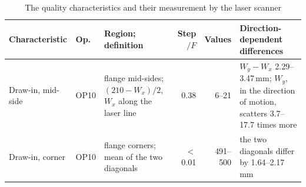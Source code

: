 \documentclass[pdflatex,sn-basic,lineno]{sn-jnl}
\newcommand{\tabsize}{\fontsize{8}{9.5}\selectfont}
\providecommand{\DIFaddbeginFL}{} %
\providecommand{\DIFdelbeginFL}{} %
\providecommand{\DIFdelendFL}{} %
\newcommand{\DIFscaledelfig}{0.5}
\newlength{\DIFdelgraphicswidth} %
\newlength{\DIFdelgraphicsheight} %
\newcommand{\DIFaddincludegraphics}[2][]{{\color{blue}\fbox{\DIFOincludegraphics[#1]{#2}}}} %
\newcommand{\DIFdelincludegraphics}[2][]{%
\sbox{\DIFdelgraphicsbox}{\DIFOincludegraphics[#1]{#2}}%
\settoboxwidth{\DIFdelgraphicswidth}{\DIFdelgraphicsbox} %
\settoboxtotalheight{\DIFdelgraphicsheight}{\DIFdelgraphicsbox} %
\scalebox{\DIFscaledelfig}{%
\parbox[b]{\DIFdelgraphicswidth}{\usebox{\DIFdelgraphicsbox}\\[-\baselineskip] \rule{\DIFdelgraphicswidth}{0em}}\llap{\resizebox{\DIFdelgraphicswidth}{\DIFdelgraphicsheight}{%
\setlength{\unitlength}{\DIFdelgraphicswidth}%
\begin{picture}(1,1)%
\thicklines\linethickness{2pt} %
{\color[rgb]{1,0,0}\put(0,0){\framebox(1,1){}}}%
{\color[rgb]{1,0,0}\put(0,0){\line( 1,1){1}}}%
{\color[rgb]{1,0,0}\put(0,1){\line(1,-1){1}}}%
\end{picture}%
}\hspace*{3pt}}} %
} %
\DeclareRobustCommand{\DIFaddbeginFL}{\DIFOaddbeginFL \let\includegraphics\DIFaddincludegraphics} %
\DeclareRobustCommand{\DIFdelbeginFL}{\DIFOdelbeginFL \let\includegraphics\DIFdelincludegraphics} %
\DeclareRobustCommand{\DIFdelendFL}{\DIFOaddendFL \let\includegraphics\DIFOincludegraphics} %
\begin{document}
\begin{table}[t]
\tabsize
\setlength{\tabcolsep}{2.4pt}
\caption{The quality characteristics and their measurement by the laser scanner}\label{tab:qcs}
\DIFdelbeginFL %
\DIFdelendFL \DIFaddbeginFL \begin{tabular}{@{}L{1.75cm}L{0.75cm}L{3.15cm}rrL{3.85cm}@{}}
\toprule
Characteristic & Op. & Region; definition & Step$/F$ & Values & Direction-dependent differences \\
\midrule
Draw-in, mid-side & OP10 & flange mid-sides; $(210-W_x)/2$, $W_x$ along the laser line & 0.38 & 6--21 & $W_y-W_x$ 2.29--3.47\,mm; $W_y$, in the direction of motion, scatters 3.7--17.7 times more \\
Draw-in, corner & OP10 & flange corners; mean of the two diagonals & $<$0.01 & 491--500 & the two diagonals differ by 1.64--2.17\,mm \\

\end{tabular}
\end{table}
\end{document}
